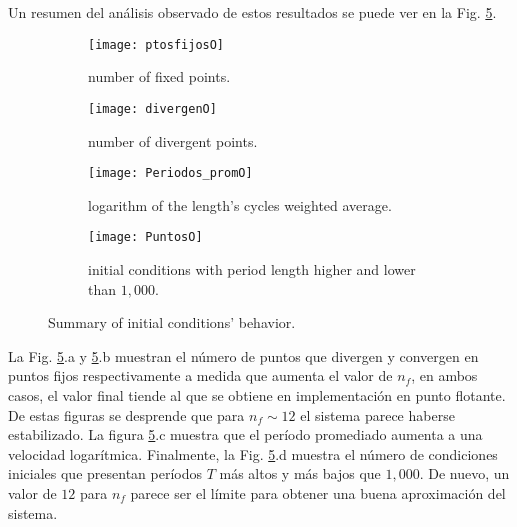 Un resumen del análisis observado de estos resultados se puede ver en la Fig. \ref{puntos}.
%
\begin{figure}
    \centering
    \begin{subfigure}[b]{0.49\textwidth}
        \texttt{[image: ptosfijosO]}
        \caption{number of fixed points.}
        \label{fig:gull}
    \end{subfigure}
    \hfill 
    \begin{subfigure}[b]{0.49\textwidth}
        \texttt{[image: divergenO]}
        \caption{number of divergent points.}
        \label{fig:tiger}
    \end{subfigure}
   \hfill 
    \begin{subfigure}[b]{0.49\textwidth}
        \texttt{[image: Periodos\_promO]}
        \caption{logarithm of the length's cycles weighted average.}
        \label{fig:mouse}
    \end{subfigure}
  \hfill   
    \begin{subfigure}[b]{0.49\textwidth}
        \texttt{[image: PuntosO]}
        \caption{initial conditions with period length higher and lower than $1,000$.}
        \label{fig:mouse}
    \end{subfigure}
    \caption{Summary of initial conditions' behavior.}\label{puntos}
\end{figure}
%
La Fig. \ref{puntos}.a y \ref{puntos}.b muestran el número de puntos que divergen y convergen en puntos fijos respectivamente a medida que aumenta el valor de $n_f$, en ambos casos, el valor final tiende al que se obtiene en implementación en punto flotante.
De estas figuras se desprende que para $n_f \sim 12$ el sistema parece haberse estabilizado.
La figura \ref{puntos}.c muestra que el período promediado aumenta a una velocidad logarítmica.
Finalmente, la Fig. \ref{puntos}.d muestra el número de condiciones iniciales que presentan períodos $T$ más altos y más bajos que $1,000$.
De nuevo, un valor de $12$ para $n_f$ parece ser el límite para obtener una buena aproximación del sistema.

